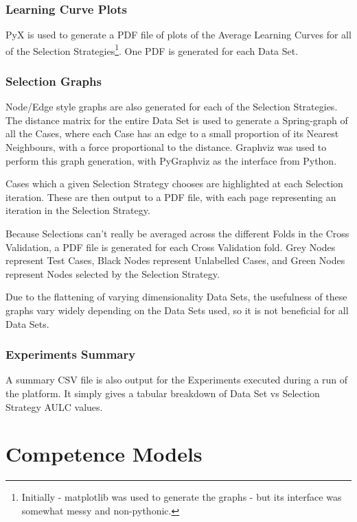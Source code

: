 \documentclass[a4paper,11pt]{report}
\begin{document}
\subsection{Learning Curve Plots}
PyX \citep{prog:pyx} is used to generate a PDF file of plots of the Average Learning Curves for all of the Selection Strategies\footnote{Initially - matplotlib \citep{prog:matplotlib} was used to generate the graphs - but its interface was somewhat messy and non-pythonic.}. One PDF is generated for each Data Set.

\subsection{Selection Graphs}
Node/Edge style graphs are also generated for each of the Selection Strategies. The distance matrix for the entire Data Set is used to generate a Spring-graph of all the Cases, where each Case has an edge to a small proportion of its Nearest Neighbours, with a force proportional to the distance. Graphviz \citep{prog:graphviz} was used to perform this graph generation, with PyGraphviz \citep{prog:pygraphviz} as the interface from Python.

Cases which a given Selection Strategy chooses are highlighted at each Selection iteration. These are then output to a PDF file, with each page representing an iteration in the Selection Strategy.

Because Selections can't really be averaged across the different Folds in the Cross Validation, a PDF file is generated for each Cross Validation fold. Grey Nodes represent Test Cases, Black Nodes represent Unlabelled Cases, and Green Nodes represent Nodes selected by the Selection Strategy.

Due to the flattening of varying dimensionality Data Sets, the usefulness of these graphs vary widely depending on the Data Sets used, so it is not beneficial for all Data Sets.

\subsection{Experiments Summary}
A summary CSV file is also output for the Experiments executed during a run of the platform. It simply gives a tabular breakdown of Data Set vs Selection Strategy AULC values.

\chapter{Competence Models\label{cha:CompetenceModels}}
\end{document}
